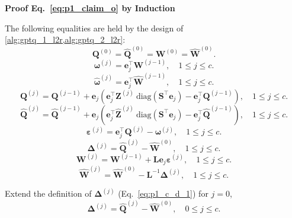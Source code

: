 \documentclass{article} %
\begin{document}
\textbf{Proof Eq.~\ref{eq:p1_claim_o} by Induction}

The following equalities are held by the design of \cref{alg:gptq_1_l2r,alg:gptq_2_l2r}:
\begin{equation}
\bm{Q}^{(0)} = \hat{\bm{Q}}^{(0)} = \bm{W}^{(0)} = \hat{\bm{W}}^{(0)} .
\label{eq:p1_c_init}
\end{equation}
\begin{equation}
\bm{\omega}^{(j)} = \mathbf{e}_{j}^\top \bm{W}^{(j-1)}, \quad 1 \le j \le c.
\label{eq:p1_c_o}
\end{equation}
\begin{equation}
\hat{\bm{\omega}}^{(j)} = \mathbf{e}_{j}^\top \hat{\bm{W}}^{(j-1)}, \quad 1 \le j \le c .
\label{eq:p1_c_oh}
\end{equation}
\begin{equation}
\bm{Q}^{(j)} = \bm{Q}^{(j-1)} + \mathbf{e}_{j} \left( \mathbf{e}_{j}^\top \bm{Z}^{(j)} \mathrm{\ diag} \left( \bm{S}^\top \mathbf{e}_{j} \right) - \mathbf{e}_{j}^\top \bm{Q}^{(j-1)} \right), \quad 1 \le j \le c .
\label{eq:p1_c_q}
\end{equation}
\begin{equation}
\hat{\bm{Q}}^{(j)} = \hat{\bm{Q}}^{(j-1)} + \mathbf{e}_{j} \left( \mathbf{e}_{j}^\top \hat{\bm{Z}}^{(j)} \mathrm{\ diag} \left( \bm{S}^\top \mathbf{e}_{j} \right) - \mathbf{e}_{j}^\top \hat{\bm{Q}}^{(j-1)} \right), \quad 1 \le j \le c .
\label{eq:p1_c_qh}
\end{equation}
\begin{equation}
\bm{\varepsilon}^{(j)} = \mathbf{e}_{j}^\top \bm{Q}^{(j)} - \bm{\omega}^{(j)}, \quad 1 \le j \le c .
\label{eq:p1_c_eps}
\end{equation}
\begin{equation}
\bm{\Delta}^{(j)} = \hat{\bm{Q}}^{(j)} - \hat{\bm{W}}^{(0)}, \quad 1 \le j \le c .
\label{eq:p1_c_d_1}
\end{equation}
\begin{equation}
\bm{W}^{(j)} = \bm{W}^{(j-1)} + \bm{L} \mathbf{e}_{j} \bm{\varepsilon}^{(j)}, \quad 1 \le j \le c .
\label{eq:p1_c_w}
\end{equation}
\begin{equation}
\hat{\bm{W}}^{(j)} = \hat{\bm{W}}^{(0)} - \bm{L}^{-1} \bm{\Delta}^{(j)}, \quad 1 \le j \le c .
\label{eq:p1_c_wh_1}
\end{equation}

Extend the definition of $\bm{\Delta}^{(j)}$ (Eq.~\ref{eq:p1_c_d_1}) for $j=0$,
\begin{equation}
\bm{\Delta}^{(j)} = \hat{\bm{Q}}^{(j)} - \hat{\bm{W}}^{(0)}, \quad 0 \le j \le c .
\label{eq:p1_c_d}
\end{equation}
\end{document}
